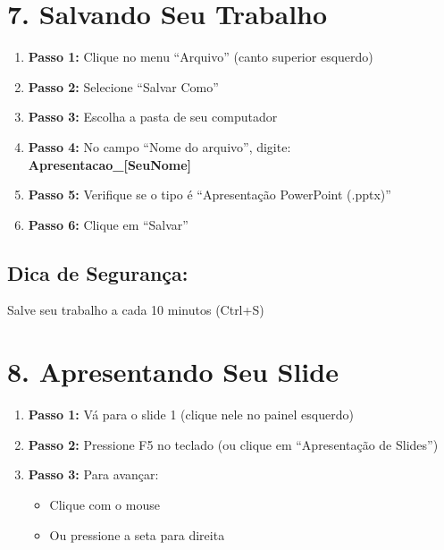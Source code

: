 \documentclass[11pt]{article}
\begin{document}
\begin{multicols}{2}

\section*{7. Salvando Seu Trabalho}

\begin{enumerate}
\item \textbf{Passo 1:} Clique no menu ``Arquivo'' (canto superior esquerdo)

\item \textbf{Passo 2:} Selecione ``Salvar Como''

\item \textbf{Passo 3:} Escolha a pasta de seu computador

\item \textbf{Passo 4:} No campo ``Nome do arquivo'', digite: \textbf{Apresentacao\_[SeuNome]}

\item \textbf{Passo 5:} Verifique se o tipo é ``Apresentação PowerPoint (.pptx)''

\item \textbf{Passo 6:} Clique em ``Salvar''
\end{enumerate}

\subsection*{Dica de Segurança:}
Salve seu trabalho a cada 10 minutos (Ctrl+S)

\section*{8. Apresentando Seu Slide}

\begin{enumerate}
\item \textbf{Passo 1:} Vá para o slide 1 (clique nele no painel esquerdo)

\item \textbf{Passo 2:} Pressione F5 no teclado (ou clique em ``Apresentação de Slides'')

\item \textbf{Passo 3:} Para avançar:
\begin{itemize}
\item Clique com o mouse
\item Ou pressione a seta para direita
\end{itemize}


\end{enumerate}
\end{multicols}
\end{document}
